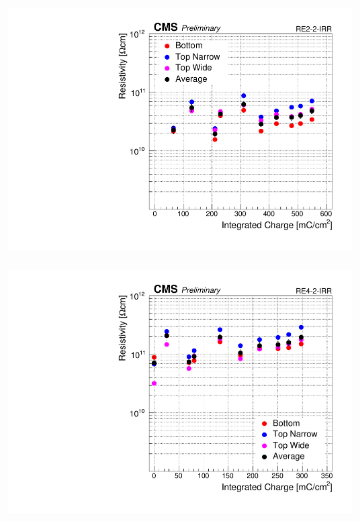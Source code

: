 	\begin{figure}[H]
    	\begin{subfigure}{0.5\linewidth}
			\centering
    		\includegraphics[width = \linewidth]{fig/chapt5/Resistivity_vs_time_RE2-2-IRR.pdf}
        	\caption{\label{fig:Resistivity-time:A}}
    	\end{subfigure}
    	\begin{subfigure}{0.5\linewidth}
			\centering
    		\includegraphics[width = \linewidth]{fig/chapt5/Resistivity_vs_time_RE4-2-IRR.pdf}
        	\caption{\label{fig:Resistivity-time:B}}
    	\end{subfigure}
    	\begin{subfigure}{0.5\linewidth}
			\centering

\end{subfigure}
\end{figure}
